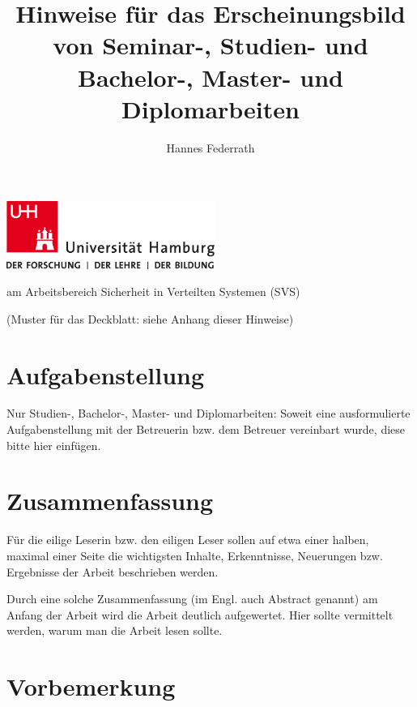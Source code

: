 \documentclass[
    fontsize=12pt,
    headings=small,
    parskip=half,           %
    bibliography=totoc,
    numbers=noenddot,       %
    open=any,               %
    ]{scrreprt}
\title{Hinweise für das Erscheinungsbild von Seminar-, Studien- und Bachelor-,
    Master- und Diplomarbeiten}
\author{Hannes Federrath}
\begin{document}
\begin{titlepage}
\includegraphics[width=6.8cm]{./pic/up-uhh-logo-u-2010-u-farbe-u-rgb.pdf}
\begin{center}\Large
    \vfill
    \makeatletter
    {\Large\textsf{\textbf{\@title}}\par}
    \makeatother
    \bigskip
    am Arbeitsbereich Sicherheit in Verteilten Systemen (SVS) \par
    \bigskip
    \makeatletter
    {\@author} \par
    \makeatother
    \bigskip
    \makeatletter
    {\@date}
    \makeatother
    \vfill
    \vfill
    (Muster für das Deckblatt: siehe Anhang dieser Hinweise)
\end{center}
\end{titlepage}

\chapter*{Aufgabenstellung}

Nur Studien-, Bachelor-, Master- und Diplomarbeiten: Soweit eine ausformulierte Aufgabenstellung mit der Betreuerin bzw. dem Betreuer vereinbart wurde, diese bitte hier einfügen.

\chapter*{Zusammenfassung}

Für die eilige Leserin bzw. den eiligen Leser sollen auf etwa einer halben, maximal einer Seite die wichtigsten Inhalte, Erkenntnisse, Neuerungen bzw. Ergebnisse der Arbeit beschrieben werden.

Durch eine solche Zusammenfassung (im Engl. auch Abstract genannt) am Anfang der Arbeit wird die Arbeit deutlich aufgewertet. Hier sollte vermittelt werden, warum man die Arbeit lesen sollte.

\tableofcontents

\chapter{Vorbemerkung}
\end{document}
